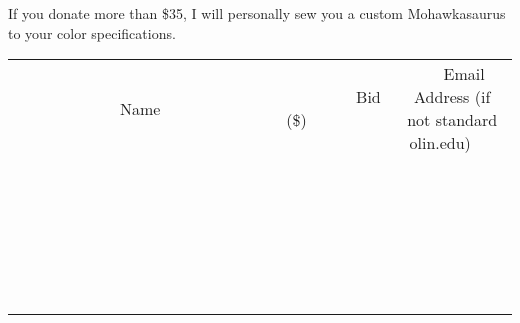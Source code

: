 \documentclass[11pt]{article}
\begin{document}
If you donate more than \$35, I will personally sew you a custom Mohawkasaurus to your color specifications.
\\[6ex]
\begin{tabular}{c c c}
~~~~~~~~~~~~~Name~~~~~~~~~~~~~ & ~~~~~~~~~Bid (\$)~~~~~~~~~  & ~~~Email Address (if not standard olin.edu)~~~\\
 & & \\
\hline
 & & \\
\hline
 & & \\
\hline
 & & \\
\hline
 & & \\
\hline
 & & \\
\hline
 & & \\
\hline
 & & \\
\hline
 & & \\
\hline
 & & \\
\hline
 & & \\
\hline
 & & \\
\hline
 & & \\
\hline
 & & \\
\hline
 & & \\
\hline
 & & \\
\hline
 & & \\
\hline
 & & \\
\hline
 & & \\
\hline
 & & \\
\hline
 & & \\
\hline
 & & \\
\hline
 & & \\
\hline
 & & \\
\hline
 & & \\
\hline
 & & \\
\hline
\end{tabular}
\newpage
\end{document}
